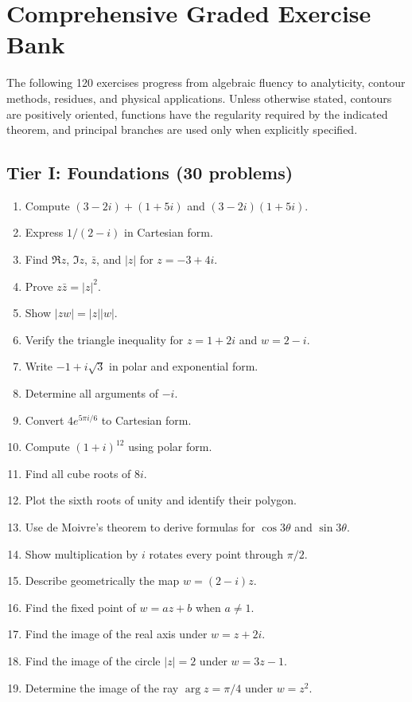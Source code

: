 \section{Comprehensive Graded Exercise Bank}
\label{sec:ch5-exercises}

The following 120 exercises progress from algebraic fluency to analyticity, contour methods, residues, and physical applications. Unless otherwise stated, contours are positively oriented, functions have the regularity required by the indicated theorem, and principal branches are used only when explicitly specified.

\subsection*{Tier I: Foundations (30 problems)}
\begin{enumerate}[label=\textbf{\arabic*.},leftmargin=*]
\item Compute $(3-2i)+(1+5i)$ and $(3-2i)(1+5i)$.
\item Express $1/(2-i)$ in Cartesian form.
\item Find $\Re z$, $\Im z$, $\bar z$, and $|z|$ for $z=-3+4i$.
\item Prove $z\bar z=|z|^2$.
\item Show $|zw|=|z||w|$.
\item Verify the triangle inequality for $z=1+2i$ and $w=2-i$.
\item Write $-1+i\sqrt3$ in polar and exponential form.
\item Determine all arguments of $-i$.
\item Convert $4e^{5\pi i/6}$ to Cartesian form.
\item Compute $(1+i)^{12}$ using polar form.
\item Find all cube roots of $8i$.
\item Plot the sixth roots of unity and identify their polygon.
\item Use de Moivre's theorem to derive formulas for $\cos3\theta$ and $\sin3\theta$.
\item Show multiplication by $i$ rotates every point through $\pi/2$.
\item Describe geometrically the map $w=(2-i)z$.
\item Find the fixed point of $w=az+b$ when $a\neq1$.
\item Find the image of the real axis under $w=z+2i$.
\item Find the image of the circle $|z|=2$ under $w=3z-1$.
\item Determine the image of the ray $\arg z=\pi/4$ under $w=z^2$.

\end{enumerate}
